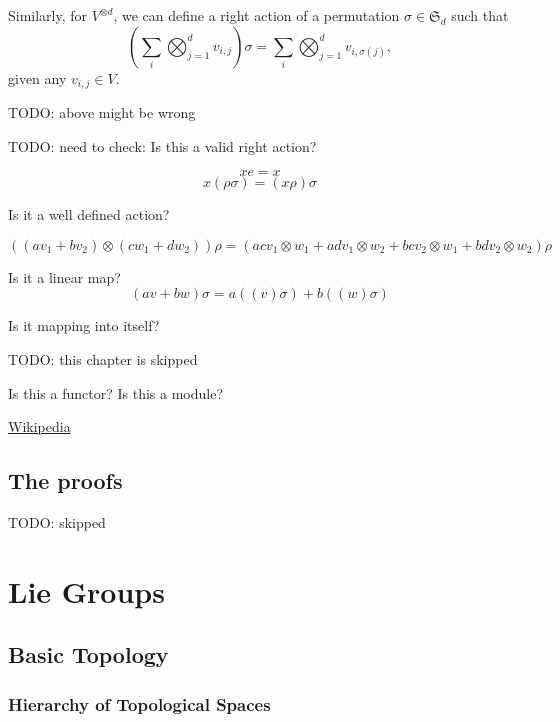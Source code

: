 \documentclass[12pt, letterpaper]{article}
\newcommand{\red}[1]{{\color{red} #1}}
\theoremstyle{definition}
\theoremstyle{remark}
\theoremstyle{definition}
\theoremstyle{plain}
\numberwithin{equation}{section}
\begin{document}
	Similarly, for $V^{\otimes d}$, we can define a right action of a permutation $\sigma\in\mathfrak{S}_d$ such that
	\[ (\sum_i \bigotimes_{j=1}^d v_{i,j})\sigma = \sum_i \bigotimes_{j=1}^d v_{i,\sigma(j)}, \]
	given any $v_{i,j}\in V$.
	
	\red{TODO: above might be wrong}
	
	\red{TODO: need to check:
	Is this a valid right action?

	\[xe=x \]	
	\[ x (\rho\sigma)=(x\rho)\sigma \]
	
	Is it a well defined action?
	
	\[ ((av_1+bv_2)\otimes(cw_1+dw_2))
	\rho=(acv_1\otimes w_1+adv_1\otimes w_2+bc v_2\otimes w_1 + bd v_2\otimes w_2)\rho \]
	
	Is it a linear map?
	\[ (av+bw)\sigma=a((v)\sigma)+b((w)\sigma) \]
	
	Is it mapping into itself?
	}

	\red{TODO: this chapter is skipped}
	
	\red{Is this a functor? Is this a module?}
	
	\href{https://en.wikipedia.org/wiki/Schur_functor}{Wikipedia}
	
	\subsection{The proofs}
	\red{TODO: skipped}
	
	\section{Lie Groups}
	
	\setcounter{subsection}{-1}
	\subsection{Basic Topology}
	\subsubsection{Hierarchy of Topological Spaces}
\end{document}
